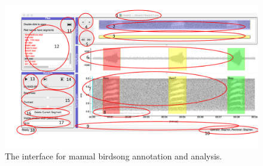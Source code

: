 \documentclass{article}
\begin{document}
\begin{figure}[h!]
\centering
\includegraphics[width=.8\textwidth]{Figs/avianzinterface.pdf}
\caption{The interface for manual birdsong annotation and analysis.}
\label{main}
\end{figure}
\end{document}
